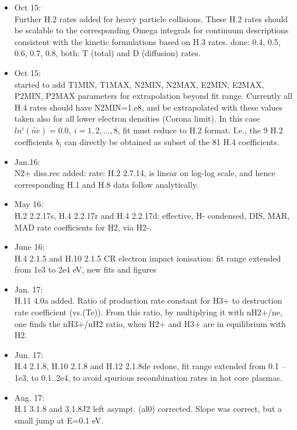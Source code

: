 \documentclass[12pt,dvipdfmx]{article}
\begin{document}
\begin{itemize}
 Similarly: H.4, such that H.2 is the correct corona limit at low densities. And also similarly: low T limit (for H.2, H.3 and H.4)
 should automatically turn into H.1 cross-section(E) times sqrt(E)...., or at least:
 threshold behaviour $1/T^2\times \exp(-\Delta E/T)$ ??
\item Oct 15:\\
Further H.2 rates added for heavy particle collisions. These H.2 rates should be scalable to
the corresponding Omega integrals for continuum descriptions consistent with the kinetic formulations based on H.3 rates.
done: 0.4, 0.5, 0.6, 0.7, 0.8, both: T (total) and D (diffusion) rates.
\item Oct 15:\\
 started to add T1MIN, T1MAX, N2MIN, N2MAX, E2MIN, E2MAX, P2MIN, P2MAX parameters for extrapolation beyond fit range.
Currently all H.4 rates should have N2MIN=1.e8,
and be extrapolated with these values taken also for all
lower electron densities (Corona limit). In this case $ln^i(\tilde{ne})=0.0,  \ i=1,2,\dots,8$, fit must reduce to H.2 format.
I.e., the 9 H.2 coefficients $b_i$ can directly be obtained as subset of the 81 H.4 coefficients.
\item Jan.16: \\
N2+ diss.rec added: rate: H.2 2.7.14, is linear on log-log scale, and hence corresponding H.1 and H.8 data follow analytically.
\item May 16: \\
H.2 2.2.17s,  H.4 2.2.17r and H.4 2.2.17d: effective, H- condensed, DIS, MAR, MAD rate coefficients for H2, via H2-.
\item June 16: \\
H.4 2.1.5 and H.10 2.1.5 CR electron impact ionisation: fit range extended from 1e3 to 2e4 eV, new fits and figures
\item Jan. 17: \\
H.11   4.0a added. Ratio of production rate constant for H3+ to destruction rate coefficient (vs.(Te)). From this ratio,
by multiplying it with nH2+/ne, one finds the nH3+/nH2 ratio, when H2+ and H3+ are in equilibrium with H2.
\item Jun. 17: \\
H.4 2.1.8, H.10  2.1.8 and H.12  2.1.8de redone, fit range extended from 0.1 --1e3, to 0.1..2e4, to avoid spurious recombination
rates in hot core plasmas.
\item Aug. 17: \\
H.1  3.1.8 and 3.1.8J2 left asympt. (al0) corrected. Slope was correct, but a small jump at E=0.1 eV.

\end{itemize}
\end{document}
